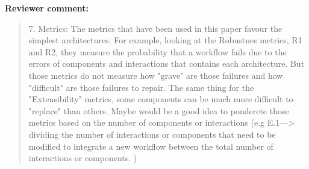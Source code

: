\documentclass[a4]{article}
\newenvironment{review}%
{\textbf{Reviewer comment:}\begin{quote}}%
{\end{quote}}%
\begin{document}
\begin{review}
  7.  Metrics: The metrics that have been used in this paper favour
  the simplest architectures. For example, looking at the Robustnes
  metrics, R1 and R2, they measure the probability that a workflow
  fails due to the errors of components and interactions that contains
  each architecture. But those metrics do not measure how "grave" are
  those failures and how "difficult" are those failures to repair. The
  same thing for the "Extensibility" metrics, some components can be
  much more difficult to "replace" than others.  Maybe would be a good
  idea to ponderete those metrics based on the number of components or
  interactions (e.g E.1---> dividing the number of interactions or
  components that need to be modified to integrate a new workflow
  between the total number of interactions or components. )
\end{review}
\end{document}

